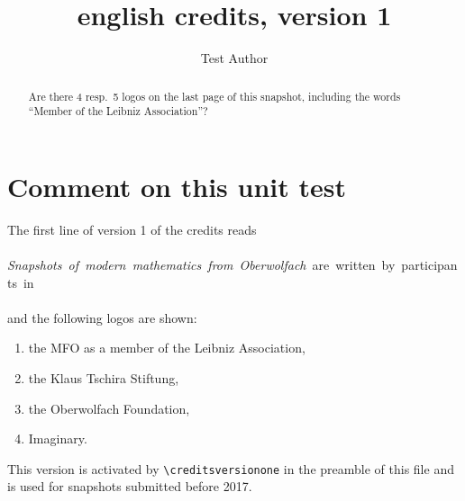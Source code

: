 \documentclass{snapshotmfo}
\author{Test Author}
\title{english credits, version 1}
\begin{document}

\begin{abstract}
Are there 4 resp.\ 5 logos on the last page of this snapshot, including the words ``Member of the Leibniz Association''?
\end{abstract}

\section{Comment on this unit test}
The first line of version 1 of the credits reads\\
\\
\hbox{\emph{Snapshots of modern mathematics from Oberwolfach} are written by participants in}\\
\\
and the following logos are shown:
\begin{enumerate}
  \item the MFO as a member of the Leibniz Association,
  \item the Klaus Tschira Stiftung,
  \item the Oberwolfach Foundation,
  \item Imaginary.
\end{enumerate}
This version is activated by \verb+\creditsversionone+ in the preamble of this file
and is used for snapshots submitted before 2017.
\end{document}
